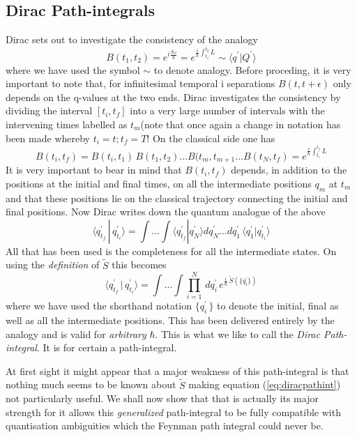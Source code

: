 \documentclass[12pt]{article}
\newcommand{\be}{\begin{equation}}
\newcommand{\ee}{\end{equation}}
\begin{document}
\subsection{Dirac Path-integrals}
Dirac sets out to investigate the consistency of the analogy
\be
\label{eq:consistency}
B(t_1,t_2) = e^{i \frac{S_{cl}}{\hbar}} = e^{\frac{i}{\hbar} \int_{t_1}^{t_2} L} \sim \langle q^\prime | Q^\prime\rangle
\ee
where we have used the symbol $\sim$ to denote analogy. Before proceding, it is very important to note that, for infinitesimal temporal i
separations $B(t,t+\epsilon)$ only depends on the q-values at the two ends. Dirac investigates the consistency by dividing the interval
$[t_i , t_f]$ into a very large number of intervals with the intervening times labelled as $t_m$(note that once again a change in notation
has been made whereby $t_i = t;t_f = T$! On the classical side one has
\be
\label{eq:consistency1}
B(t_i , t_f) = B(t_i,t_1)\,B(t_1,t_2) \ldots B(t_m, t_{m+1} \ldots B(t_N, t_f) = e^{\frac{i}{\hbar}\int_{t_i}^{t_f} L}
\ee
It is very important to bear in mind that $B(t_i,t_f)$ depends, in addition to the positions at the initial and final times, on all the 
intermediate positions $q_m$ at $t_m$ and that these positions lie on the classical trajectory connecting the initial and final positions.
Now Dirac writes down the quantum analogue of the above
\be
\label{eq:qconsistency}
\langle q_{t_f}^\prime\,|\,q_{t_i}^\prime \rangle  = \int\ldots \int \langle q_{t_f}^\prime|q_N^\prime\rangle dq_N^\prime\ldots
dq_1^\prime\,\langle q_1^\prime|q_{t_i}^\prime\rangle
\ee
All that has been used is the completeness for all the intermediate states. On using the {\it definition} of ${\tilde S}$ this becomes
\be
\label{eq:diracpathint}
\langle q_{t_f}^\prime\,|\,q_{t_i}^\prime \rangle  =  \int \ldots \int \prod_{i=1}^{N}\,dq_i^\prime\,e^{\frac{i}{\hbar}\,{\tilde S}(\{q_i^\prime\})}
\ee 
where we have used the shorthand notation $\{q_i^\prime\,\}$ to denote the initial, final as well as all the intermediate positions. This
has been delivered entirely by the analogy and is valid for {\it arbitrary} $\hbar$. This is what we like to call the {\it Dirac Path-integral}. 
It is for certain a path-integral.

At first sight it might appear that a major weakness of this path-integral is that nothing much seems to be known about ${\tilde S}$ making
 equation (\ref{eq:diracpathint}) not particularly useful. We shall now show that that is actually its major strength for it allows this
{\it generalized} path-integral to be fully compatible with quantisation ambiguities which the Feynman path integral could never be.
\end{document}
